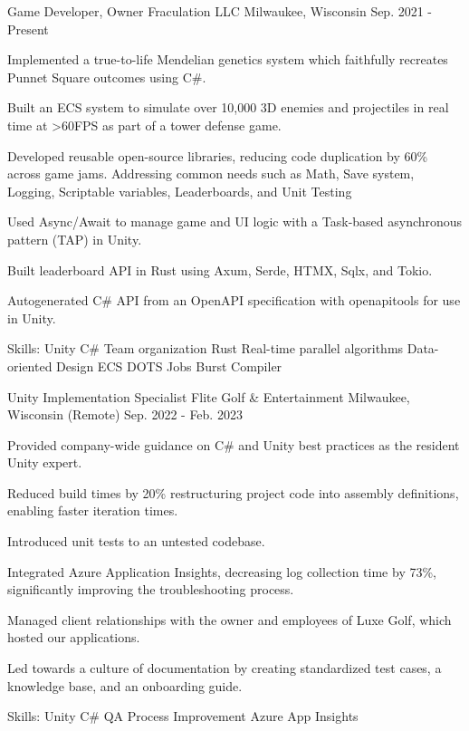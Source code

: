 \begin{cventries}
  \cventry
 {Game Developer, Owner} %
 {Fraculation LLC} %
 {Milwaukee, Wisconsin} %
 {Sep. 2021 - Present} %
 {
      \begin{cvitems} %
        \item {Implemented a true-to-life Mendelian genetics system which faithfully recreates Punnet Square outcomes using C\#.}
        \item {Built an ECS system to simulate over 10,000 3D enemies and projectiles in real time at >60FPS as part of a tower defense game.}
        \item {Developed reusable open-source libraries, reducing code duplication by 60\% across game jams. Addressing common needs such as Math, Save system, Logging, Scriptable variables, Leaderboards, and Unit Testing}
        \item {Used Async/Await to manage game and UI logic with a Task-based asynchronous pattern (TAP) in Unity.}
        \item {Built leaderboard API in Rust using Axum, Serde, HTMX, Sqlx, and Tokio.}
        \item {Autogenerated C\# API from an OpenAPI specification with openapitools for use in Unity.}
        \item {Skills: Unity \textbullet{} C\# \textbullet{} Team organization \textbullet{} Rust \textbullet{} Real-time parallel algorithms \textbullet{} Data-oriented Design \textbullet{} ECS \textbullet{} DOTS \textbullet{} Jobs \textbullet{} Burst Compiler}
      \end{cvitems}
 }

  \cventry
 {Unity Implementation Specialist} %
 {Flite Golf \& Entertainment} %
 {Milwaukee, Wisconsin (Remote)} %
 {Sep. 2022 - Feb. 2023} %
 {
      \begin{cvitems} %
        \item {Provided company-wide guidance on C\# and Unity best practices as the resident Unity expert.}
        \item {Reduced build times by 20\% restructuring project code into assembly definitions, enabling faster iteration times.}
        \item {Introduced unit tests to an untested codebase.}
        \item {Integrated Azure Application Insights, decreasing log collection time by 73\%, significantly improving the troubleshooting process.}
        \item {Managed client relationships with the owner and employees of Luxe Golf, which hosted our applications.}
        \item {Led towards a culture of documentation by creating standardized test cases, a knowledge base, and an onboarding guide.}
        \item {Skills: Unity \textbullet{} C\# \textbullet{} QA Process Improvement \textbullet{} Azure App Insights}
      \end{cvitems}
 }


\end{cventries}
